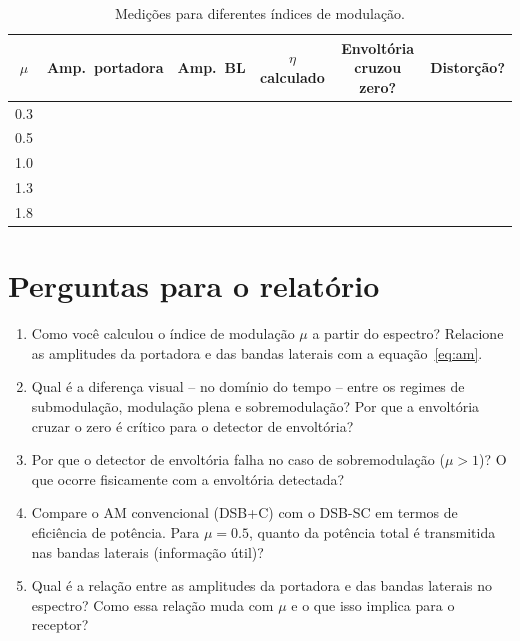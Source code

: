 \documentclass[11pt,a4paper]{article}
\begin{document}
\begin{table}[H]
  \centering
  \begin{tabular}{c c c c c c}
    \toprule
    $\mu$ & Amp.\ portadora & Amp.\ BL & $\eta$ calculado &
      Envoltória cruzou zero? & Distorção? \\
    \midrule
    0.3 & & & & &  \\
    0.5 & & & & &  \\
    1.0 & & & & &  \\
    1.3 & & & & &  \\
    1.8 & & & & &  \\
    \bottomrule
  \end{tabular}
  \caption{Medições para diferentes índices de modulação.}
\end{table}

\section{Perguntas para o relatório}

\begin{enumerate}[label=\textbf{Q\arabic*.}, leftmargin=*]

  \item Como você calculou o índice de modulação $\mu$ a partir do espectro?
    Relacione as amplitudes da portadora e das bandas laterais com a
    equação~\eqref{eq:am}.

  \item Qual é a diferença visual -- no domínio do tempo -- entre os regimes
    de submodulação, modulação plena e sobremodulação? Por que a envoltória
    cruzar o zero é crítico para o detector de envoltória?

  \item Por que o detector de envoltória falha no caso de sobremodulação
    ($\mu > 1$)? O que ocorre fisicamente com a envoltória detectada?

  \item Compare o AM convencional (DSB+C) com o DSB-SC em termos de eficiência
    de potência. Para $\mu = 0.5$, quanto da potência total é transmitida
    nas bandas laterais (informação útil)?

  \item Qual é a relação entre as amplitudes da portadora e das bandas
    laterais no espectro? Como essa relação muda com $\mu$ e o que isso
    implica para o receptor?

\end{enumerate}
\end{document}
